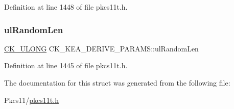Definition at line 1448 of file pkcs11t.\+h.

\mbox{\label{struct_c_k___k_e_a___d_e_r_i_v_e___p_a_r_a_m_s_a262da7e616b091eb5287cd0c04334c21}} 
\subsubsection{\texorpdfstring{ul\+Random\+Len}{ulRandomLen}}
{\footnotesize\ttfamily \hyperlink{pkcs11t_8h_a35181858a3b7a0a81f49d180d8f446ef}{C\+K\+\_\+\+U\+L\+O\+NG} C\+K\+\_\+\+K\+E\+A\+\_\+\+D\+E\+R\+I\+V\+E\+\_\+\+P\+A\+R\+A\+M\+S\+::ul\+Random\+Len}



Definition at line 1445 of file pkcs11t.\+h.



The documentation for this struct was generated from the following file\+:\begin{DoxyCompactItemize}
\item 
Pkcs11/\hyperlink{pkcs11t_8h}{pkcs11t.\+h}\end{DoxyCompactItemize}
